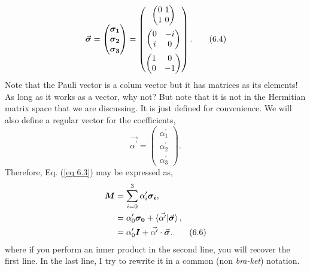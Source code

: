 \documentclass{article}
\begin{document}
\begin{equation}\label{eq 6.4}
    \boldsymbol{\vec{\sigma}}=\begin{pmatrix}
        \boldsymbol{\sigma_1}\\\boldsymbol{\sigma_2}\\ \boldsymbol{\sigma_3}
    \end{pmatrix}=
    \begin{pmatrix}
        \begin{pmatrix}
            0\ 1\\ 1\ 0
        \end{pmatrix}\\ \addlinespace
        \begin{pmatrix}
            0& -i\\i &0
        \end{pmatrix}\\ \addlinespace
        \begin{pmatrix}
            1 &0\\0&-1
        \end{pmatrix}
    \end{pmatrix}.\tag{6.4}
\end{equation}
Note that the Pauli vector is a colum vector but it has matrices as its elements!
As long as it works as a vector, why not? But note that it is not in the Hermitian
matrix space that we are discussing. It is just defined for convenience. We will also 
define a regular vector for the coefficients,
\begin{equation} \label{eq 6.5}
    \vec{\alpha^\prime}=\begin{pmatrix}
        \alpha_1^\prime\\ \alpha_2^\prime \\ \alpha_3^\prime
    \end{pmatrix}.\tag{6.5}
\end{equation}
Therefore, Eq. (\ref{eq 6.3}) may be expressed as,
\begin{align*} \label{eq 6.6}
    \boldsymbol{M}&=\sum_{i=0}^{3}\alpha_i^\prime\boldsymbol{\sigma_i},\\
    &=\alpha_0^\prime\boldsymbol{\sigma_0}+\braket{\vec{\alpha^\prime}|\vec{\boldsymbol{\sigma}}},\\
    &=\alpha_0^\prime\boldsymbol{I}+\vec{\alpha^\prime} \cdot \vec{\boldsymbol{\sigma}}.\tag{6.6}
\end{align*}
where if you perform an inner product in the second line, you will recover the first line. In the last line,
I try to rewrite it in a common (non \textit{bra-ket}) notation.\\\\
\end{document}
